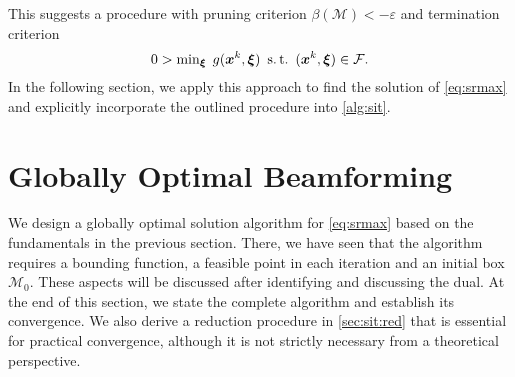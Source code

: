 \documentclass[a4paper,10pt,journal]{IEEEtran}
\newcommand{\st}{\mathrm{s.\,t.}}
\let\vec\bm
\begin{document}
This suggests a  procedure with pruning criterion $\beta(\mathcal M) < -\varepsilon$ and termination criterion
\begin{equation} \label{eq:sit:primalfeas}
	 0 > \min\nolimits_{\vec\xi}\; g(\vec x^k, \vec\xi) \enskip\st\enskip (\vec x^k, \vec\xi)\in\mathcal F.
\end{equation}
In the following section, we apply this approach to find the solution of \cref{eq:srmax} and explicitly incorporate the outlined  procedure into \cref{alg:sit}.


\section{Globally Optimal Beamforming} \label{sec:alg}
We design a globally optimal solution algorithm for \cref{eq:srmax} based on the fundamentals in the previous section.
There, we have seen that the  algorithm requires a bounding function, a feasible point in each iteration and an initial box $\mathcal M_0$. These aspects will be discussed after identifying and discussing the  dual. At the end of this section, we state the complete algorithm and establish its convergence.
We also derive a reduction procedure in \cref{sec:sit:red} that is essential for practical convergence, although it is not strictly necessary from a theoretical perspective.
\end{document}
